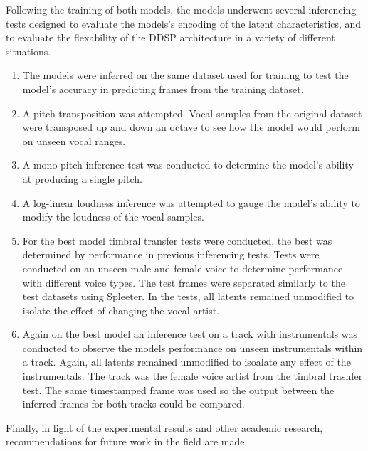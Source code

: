 Following the training of both models, the models underwent several inferencing tests designed to evaluate the models's encoding of the latent characteristics, and to evaluate the flexability of the DDSP architecture in a variety of different situations.

\begin{enumerate}
    \item The models were inferred on the same dataset used for training to test the model's accuracy in predicting frames from the training dataset.
    \item A pitch transposition was attempted. Vocal samples from the original dataset were transposed up and down an octave to see how the model would perform on unseen vocal ranges.
    \item A mono-pitch inference test was conducted to determine the model's ability at producing a single pitch.
    \item A log-linear loudness inference was attempted to gauge the model's ability to modify the loudness of the vocal samples.
    \item For the best model timbral transfer tests were conducted, the best was determined by performance in previous inferencing tests. Tests were conducted on an unseen male and female voice to determine performance with different voice types. The test frames were separated similarly to the test datasets using Spleeter. In the tests, all latents remained unmodified to isolate the effect of changing the vocal artist.
    \item Again on the best model an inference test on a track with instrumentals was conducted to observe the models performance on unseen instrumentals within a track. Again, all latents remained unmodified to isoalate any effect of the instrumentals. The track was the female voice artist from the timbral trasnfer test. The same timestamped frame was used so the output between the inferred frames for both tracks could be compared.
\end{enumerate}

Finally, in light of the experimental results and other academic research, recommendations for future work in the field are made.